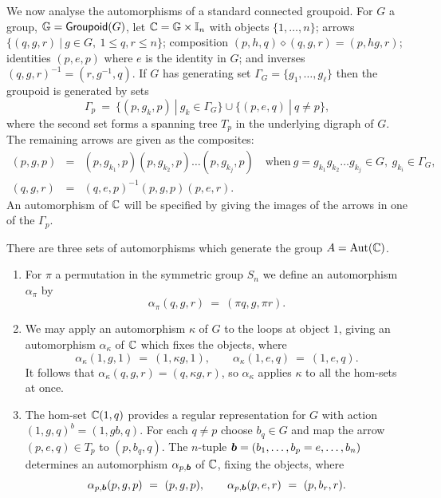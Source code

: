 \bigskip
We now analyse the automorphisms of a standard connected groupoid. 
For $G$ a group, $\mathbb{G} = {\sf Groupoid}(G)$, 
let $\mathbb{C} = \mathbb{G} \times \mathbb{I}_n$ with objects $\{1,\ldots,n\}$; 
arrows $\{(q,g,r) ~|~ g \in G,~ 1 \leqslant q,r \leqslant n\}$; 
composition $(p,h,q)\diamond(q,g,r) = (p,hg,r)$; 
identities $(p,e,p)$ where $e$ is the identity in $G$; 
and inverses $(q,g,r)^{-1} = (r,g^{-1},q)$. 
If $G$ has generating set $\Gamma_G = \{g_1,\ldots,g_{\ell}\}$ 
then the groupoid is generated by sets  
$$
\Gamma_p ~=~ \{(p,g_k,p) ~|~ g_k \in \Gamma_G\} \cup 
             \{(p,e,q) ~|~ q \neq p\}, 
$$
where the second set forms a spanning tree $T_p$ in the underlying 
digraph of $G$. 
The remaining arrows are given as the composites: 
\begin{eqnarray*}
(p,g,p) &=& (p,g_{k_1},p)(p,g_{k_2},p)\ldots(p,g_{k_j},p) \quad\text{when}~ 
             g = g_{k_1}g_{k_2}\ldots g_{k_j} \in G,~ g_{k_i} \in \Gamma_G, \\
(q,g,r) &=& (q,e,p)^{-1}(p,g,p)(p,e,r).
\end{eqnarray*}
An automorphism of $\mathbb{C}$ will be specified by giving the images 
of the arrows in one of the $\Gamma_p$. 

\medskip
There are three sets of automorphisms which generate the group 
$A = \mathrm{Aut}(\mathbb{C})$. 
\begin{enumerate}[(1)] 
\item
For $\pi$ a permutation in the symmetric group $S_n$ 
we define an automorphism $\alpha_{\pi}$ by 
$$
\alpha_{\pi}(q,g,r) ~=~ (\pi q, g,\pi r).
$$

\item
We may apply an automorphism $\kappa$ of $G$ to the loops at object $1$, 
giving an automorphism $\alpha_{\kappa}$ of $\mathbb{C}$ 
which fixes the objects, where 
$$
\alpha_{\kappa}(1,g,1) ~=~ (1,\kappa g,1), \qquad 
\alpha_{\kappa}(1,e,q) ~=~ (1,e,q).
$$ 
It follows that $\alpha_{\kappa}(q,g,r) = (q,\kappa g,r)$, 
so $\alpha_{\kappa}$ applies $\kappa$ to all the hom-sets at once. 

\item
The hom-set $\mathbb{C}(1,q)$ provides a regular representation for $G$ 
with action $(1,g,q)^b = (1,gb,q)$. 
For each $q \neq p$ choose $b_q \in G$ and map the arrow $(p,e,q) \in T_p$ 
to $(p,b_q,q)$. 
The $n$-tuple $\boldsymbol{b} = (b_1,\ldots,b_p=e,\ldots,b_n)$ determines an 
automorphism $\alpha_{p,\boldsymbol{b}}$ of $\mathbb{C}$, fixing the objects, where 
$$
\alpha_{p,\boldsymbol{b}}(p,g,p) ~=~ (p,g,p), \qquad 
\alpha_{p,\boldsymbol{b}}(p,e,r) ~=~ (p,b_r,r). 
$$
\end{enumerate}

